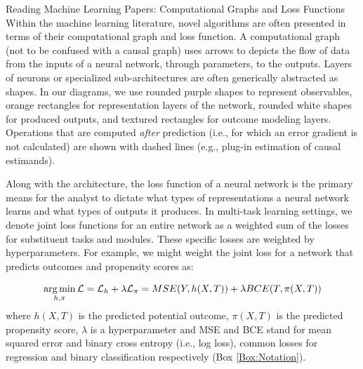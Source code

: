 \begin{TCBBox}[label=Box:training]{Reading Machine Learning Papers: Computational Graphs and Loss Functions}
Within the machine learning literature, novel algorithms are often presented in terms of their computational graph and loss function. A computational graph (not to be confused with a causal graph) uses arrows to depicts the flow of data from the inputs of a neural network,  through parameters, to the outputs. Layers of neurons or specialized sub-architectures are often generically abstracted as shapes. In our diagrams, we use rounded purple shapes to represent observables, orange rectangles for representation layers of the network, rounded white shapes for produced outputs, and textured rectangles for outcome modeling layers. Operations that are computed \textit{after} prediction (i.e., for which an error gradient is not calculated) are shown with dashed lines (e.g., plug-in estimation of causal estimands).

Along with the architecture, the loss function of a neural network is the primary means for the analyst to dictate what types of representations a neural network learns and what types of outputs it produces. In multi-task learning settings, we denote joint loss functions for an entire network as a weighted sum of the losses for substituent tasks and modules. These specific losses are weighted by hyperparameters. For example, we might weight the joint loss for a network that predicts outcomes and propensity scores as:

\begin{equation*}
    \operatorname*{arg\,min}_{h,\pi}\mathcal{L} = \mathcal{L}_h + \lambda \mathcal{L}_\pi = MSE(Y,h(X,T)) + \lambda BCE(T,\pi(X,T))
\end{equation*}
where $h(X,T)$ is the predicted potential outcome, $\pi(X,T)$ is the predicted propensity score, $\lambda$ is a hyperparameter and MSE and BCE stand for mean squared error and binary cross entropy (i.e., log loss), common losses for regression and binary classification respectively (Box \ref{Box:Notation}). 
\end{TCBBox}


